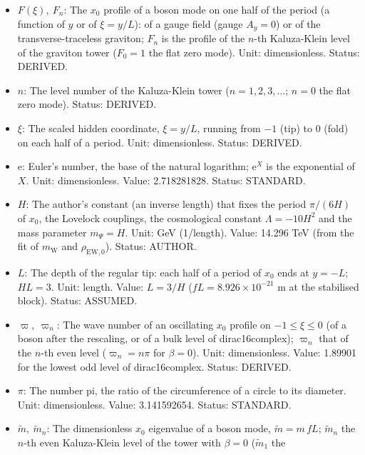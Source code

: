 \documentclass[
  10pt,
]{article}
\providecommand{\tightlist}{%
  \setlength{\itemsep}{0pt}\setlength{\parskip}{0pt}}
\begin{document}
\begin{itemize}
\tightlist
\item
  \(F(\xi),\ F_n\): The \(x_0\) profile of a boson mode on one half of
  the period (a function of \(y\) or of \(\xi = y/L\)): of a gauge field
  (gauge \(A_y = 0\)) or of the transverse-traceless graviton; \(F_n\)
  is the profile of the \(n\)-th Kaluza-Klein level of the graviton
  tower (\(F_0 = 1\) the flat zero mode). Unit: dimensionless. Status:
  DERIVED.
\item
  \(n\): The level number of the Kaluza-Klein tower
  (\(n = 1, 2, 3, \dots\); \(n = 0\) the flat zero mode). Status:
  DERIVED.
\item
  \(\xi\): The scaled hidden coordinate, \(\xi = y/L\), running from
  \(-1\) (tip) to \(0\) (fold) on each half of a period. Unit:
  dimensionless. Status: DERIVED.
\item
  \(\mathrm{e}\): Euler's number, the base of the natural logarithm;
  \(\mathrm{e}^{X}\) is the exponential of \(X\). Unit: dimensionless.
  Value: 2.718281828. Status: STANDARD.
\item
  \(H\): The author's constant (an inverse length) that fixes the period
  \(\pi/(6H)\) of \(x_0\), the Lovelock couplings, the cosmological
  constant \(\Lambda = -10H^2\) and the mass parameter \(m_\Psi = H\).
  Unit: GeV (1/length). Value: 14.296 TeV (from the fit of
  \(m_{\mathrm{W}}\) and \(\rho_{\mathrm{EW},0}\)). Status: AUTHOR.
\item
  \(L\): The depth of the regular tip: each half of a period of \(x_0\)
  ends at \(y = -L\); \(HL = 3\). Unit: length. Value: \(L = 3/H\)
  (\(fL = 8.926\times10^{-21}\) m at the stabilised block). Status:
  ASSUMED.
\item
  \(\varpi,\ \varpi_n\): The wave number of an oscillating \(x_0\)
  profile on \(-1 \le \xi \le 0\) (of a boson after the rescaling, or of
  a bulk level of dirac16complex); \(\varpi_n\) that of the \(n\)-th
  even level (\(\varpi_n = n\pi\) for \(\beta = 0\)). Unit:
  dimensionless. Value: 1.89901 for the lowest odd level of
  dirac16complex. Status: DERIVED.
\item
  \(\pi\): The number pi, the ratio of the circumference of a circle to
  its diameter. Unit: dimensionless. Value: 3.141592654. Status:
  STANDARD.
\item
  \(\tilde m,\ \tilde m_n\): The dimensionless \(x_0\) eigenvalue of a
  boson mode, \(\tilde m = m\,fL\); \(\tilde m_n\) the \(n\)-th even
  Kaluza-Klein level of the tower with \(\beta = 0\) (\(\tilde m_1\) the

\end{itemize}
\end{document}
